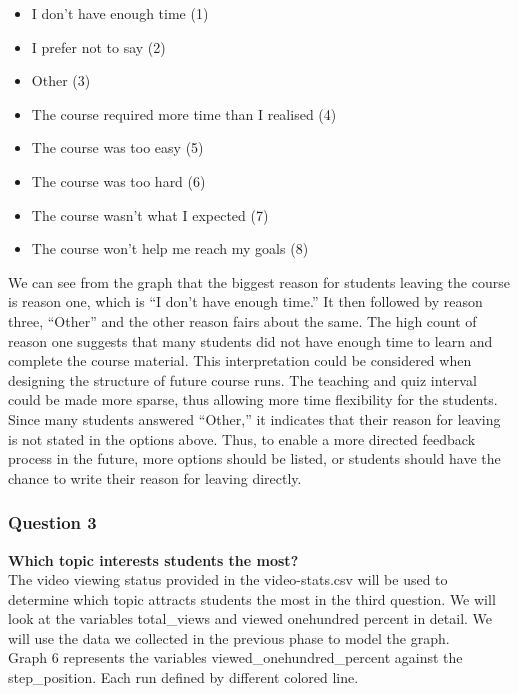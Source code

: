 \documentclass[12pt,]{article}
\providecommand{\tightlist}{%
\setlength{\itemsep}{0pt}\setlength{\parskip}{0pt}}
\begin{document}
\begin{itemize}
\tightlist
\item
  I don't have enough time (1)
\item
  I prefer not to say (2)
\item
  Other (3)
\item
  The course required more time than I realised (4)
\item
  The course was too easy (5)
\item
  The course was too hard (6)
\item
  The course wasn't what I expected (7)
\item
  The course won't help me reach my goals (8)
\end{itemize}

\noindent We can see from the graph that the biggest reason for students
leaving the course is reason one, which is ``I don't have enough time.''
It then followed by reason three, ``Other'' and the other reason fairs
about the same. The high count of reason one suggests that many students
did not have enough time to learn and complete the course material. This
interpretation could be considered when designing the structure of
future course runs. The teaching and quiz interval could be made more
sparse, thus allowing more time flexibility for the students. Since many
students answered ``Other,'' it indicates that their reason for leaving
is not stated in the options above. Thus, to enable a more directed
feedback process in the future, more options should be listed, or
students should have the chance to write their reason for leaving
directly.

\hypertarget{question-3-1}{%
\subsubsection{Question 3}\label{question-3-1}}

\textbf{Which topic interests students the most?}\\
\hfill\break The video viewing status provided in the video-stats.csv
will be used to determine which topic attracts students the most in the
third question. We will look at the variables total\_views and viewed
onehundred percent in detail. We will use the data we collected in the
previous phase to model the graph.\\
\hfill\break Graph 6 represents the variables
viewed\_onehundred\_percent against the step\_position. Each run defined
by different colored line.
\end{document}
